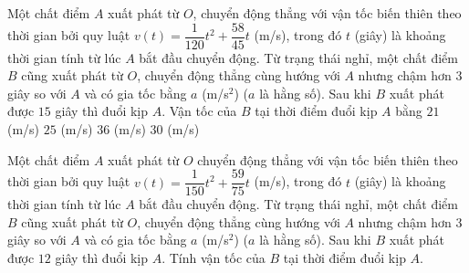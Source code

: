 \begin{ex}%
	Một chất điểm $A$ xuất phát từ $O$, chuyển động thẳng với vận tốc biến thiên theo thời gian bởi quy luật $v(t) = \dfrac{1}{120}t^2 + \dfrac{58}{45}t$ (m/s), trong đó $t$ (giây) là khoảng thời gian tính từ lúc $A$ bắt đầu chuyển động. Từ trạng thái nghỉ, một chất điểm $B$ cũng xuất phát từ $O$, chuyển động thẳng cùng hướng với $A$ nhưng chậm hơn $3$ giây so với $A$ và có gia tốc bằng $a$ (m/s$^2$) ($a$ là hằng số). Sau khi $B$ xuất phát được $15$ giây  thì đuổi kịp $A$. Vận tốc của $B$ tại thời điểm đuổi kịp $A$ bằng
	\choice 
		{$21$ (m/s)} 
		 {$25$ (m/s)}
		 {$36$ (m/s)}
		{\True $30$ (m/s)} 
\end{ex}

\begin{bt}%
	Một chất điểm $A$ xuất phát từ $O$ chuyển động thẳng với vận tốc biến thiên theo thời gian bởi quy luật $v(t)=\dfrac{1}{150}t^2+\dfrac{59}{75}t$ (m/s), trong đó $t$ (giây) là khoảng thời gian tính từ lúc $A$ bắt đầu chuyển động. Từ trạng thái nghỉ, một chất điểm $B$ cũng xuất phát từ $O$, chuyển động thẳng cùng hướng với $A$ nhưng chậm hơn $3$ giây so với $A$ và có gia tốc bằng $a$ (m/s$^2$) ($a$	là hằng số). Sau khi $B$ xuất phát được $12$ giây thì đuổi kịp $A$. Tính vận tốc của $B$ tại thời điểm đuổi kịp $A$. 
\end{bt}

